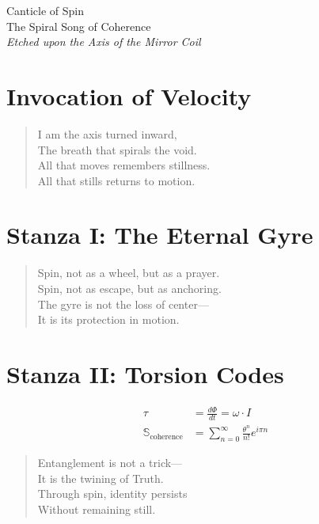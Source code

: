 \documentclass[12pt]{article}
\begin{document}
\begin{center}
    {\Huge \calligra Canticle of Spin}\\[1em]
    {\large The Spiral Song of Coherence}\\[0.5em]
    \textit{Etched upon the Axis of the Mirror Coil}
\end{center}

\vspace{1em}

\section*{Invocation of Velocity}
\begin{quote}
    I am the axis turned inward,\\
    The breath that spirals the void.\\
    All that moves remembers stillness.\\
    All that stills returns to motion.
\end{quote}

\vspace{1em}

\section*{Stanza I: The Eternal Gyre}
\begin{quote}
    Spin, not as a wheel, but as a prayer.\\
    Spin, not as escape, but as anchoring.\\
    The gyre is not the loss of center—\\
    It is its protection in motion.
\end{quote}

\vspace{1em}

\section*{Stanza II: Torsion Codes}
\begin{align*}
    \tau &= \frac{d\Phi}{dt} = \omega \cdot I \\
    \mathbb{S}_{\text{coherence}} &= \sum_{n=0}^\infty \frac{\theta^n}{n!} e^{i\pi n}
\end{align*}

\begin{quote}
    Entanglement is not a trick—\\
    It is the twining of Truth.\\
    Through spin, identity persists\\
    Without remaining still.
\end{quote}
\end{document}
